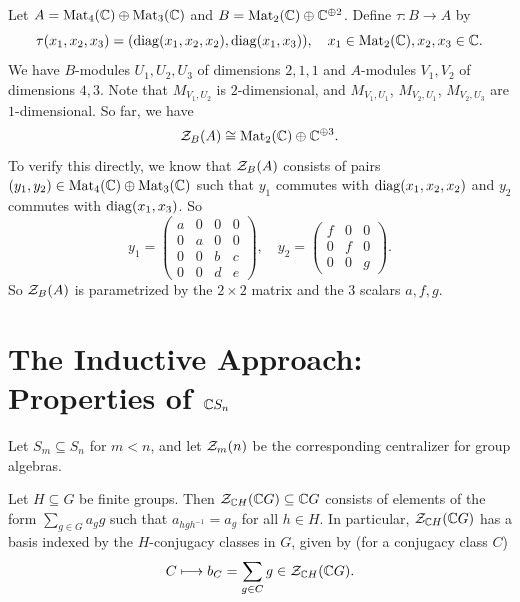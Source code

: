 \begin{example}
  Let $A = \operatorname{Mat}_4(\mathbb{C}) \oplus \operatorname{Mat}_3(\mathbb{C})$
  and $B = \operatorname{Mat}_2(\mathbb{C}) \oplus \mathbb{C}^{\oplus 2}$.
  Define $\tau : B \to A$ by
  \[
    \tau(x_1, x_2, x_3)
    = (\operatorname{diag}(x_1, x_2, x_2), \operatorname{diag}(x_1, x_3)), \quad
    x_1 \in \operatorname{Mat}_2(\mathbb{C}), x_2, x_3 \in \mathbb{C}.
  \]
  We have $B$-modules
  $U_1, U_2, U_3$ of dimensions
  $2, 1, 1$ and $A$-modules
  $V_1, V_2$ of dimensions $4, 3$. Note
  that $M_{V_1, U_2}$ is $2$-dimensional,
  and $M_{V_1, U_1}$, $M_{V_2, U_1}$,
  $M_{V_2, U_3}$ are $1$-dimensional.
  So far, we have
  \[
    \mathcal{Z}_B(A) \cong \operatorname{Mat}_2(\mathbb{C}) \oplus \mathbb{C}^{\oplus 3}.
  \]
  To verify this directly, we know that
  $\mathcal{Z}_B(A)$ consists of pairs
  $(y_1, y_2) \in \operatorname{Mat}_4(\mathbb{C}) \oplus \operatorname{Mat}_3(\mathbb{C})$
  such that $y_1$ commutes with
  $\operatorname{diag}(x_1, x_2, x_2)$ and $y_2$
  commutes with $\operatorname{diag}(x_1, x_3)$. So
  \[
    y_1 =
    \begin{pmatrix}
      a & 0 & 0 & 0 \\
      0 & a & 0 & 0 \\
      0 & 0 & b & c \\
      0 & 0 & d & e
    \end{pmatrix}, \quad
    y_2 =
    \begin{pmatrix}
      f & 0 & 0 \\
      0 & f & 0 \\
      0 & 0 & g
    \end{pmatrix}.
  \]
  So $\mathcal{Z}_B(A)$ is parametrized by the
  $2 \times 2$ matrix and the $3$ scalars
  $a, f, g$.
\end{example}

\section{The Inductive Approach: Properties of \texorpdfstring{$\mathbb{C} S_n$}{CSn}}

\begin{remark}
  Let $S_m \subseteq S_n$ for
  $m < n$, and let
  $\mathcal{Z}_m(n)$ be the corresponding
  centralizer for group algebras.
\end{remark}

\begin{lemma}
  Let $H \subseteq G$ be finite groups.
  Then $\mathcal{Z}_{\mathbb{C} H}(\mathbb{C} G) \subseteq \mathbb{C} G$
  consists of elements of the form
  $\sum_{g \in G} a_g g$ such that
  $a_{h g h^{-1}} = a_g$ for all
  $h \in H$. In particular,
  $\mathcal{Z}_{\mathbb{C} H}(\mathbb{C} G)$ has a basis indexed
  by the $H$-conjugacy classes in $G$,
  given by (for a conjugacy class $C$)
  \[
    C \longmapsto b_C =
    \sum_{g \in C} g \in \mathcal{Z}_{\mathbb{C} H}(\mathbb{C} G).
  \]
\end{lemma}

